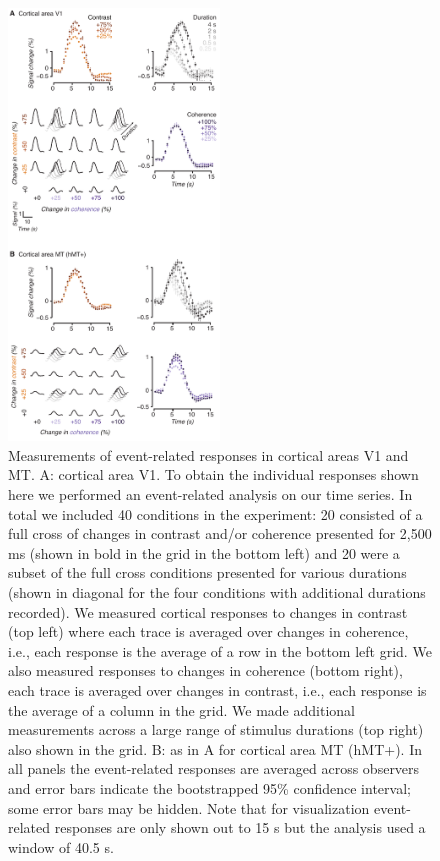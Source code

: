 \begin{figure}
\centering
\includegraphics[keepaspectratio,width=0.5\textwidth]{figs_c2/Fig2_v1mt.pdf}
\caption[Measurements of event-related responses in cortical areas V1 and MT]{Measurements of event-related responses in cortical areas V1 and MT. A: cortical area V1. To obtain the individual responses shown here we performed an event-related analysis on our time series. In total we included 40 conditions in the experiment: 20 consisted of a full cross of changes in contrast and/or coherence presented for 2,500 ms (shown in bold in the grid in the bottom left) and 20 were a subset of the full cross conditions presented for various durations (shown in diagonal for the four conditions with additional durations recorded). We measured cortical responses to changes in contrast (top left) where each trace is averaged over changes in coherence, i.e., each response is the average of a row in the bottom left grid. We also measured responses to changes in coherence (bottom right), each trace is averaged over changes in contrast, i.e., each response is the average of a column in the grid. We made additional measurements across a large range of stimulus durations (top right) also shown in the grid. B: as in A for cortical area MT (hMT+). In all panels the event-related responses are averaged across observers and error bars indicate the bootstrapped 95\% confidence interval; some error bars may be hidden. Note that for visualization event-related responses are only shown out to 15 s but the analysis used a window of 40.5 s.}
\label{fig:c2f2}
\end{figure}

